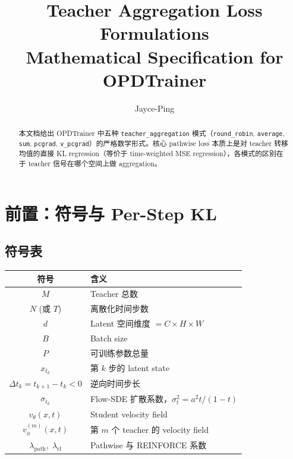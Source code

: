 \documentclass[11pt,a4paper]{article}
\title{\textbf{Teacher Aggregation Loss Formulations}\\[0.3em]
\large Mathematical Specification for OPDTrainer}
\author{Jayce-Ping}
\date{}
\newcommand{\vtheta}{v_\theta}
\newcommand{\vphi}{v_\phi}
\newcommand{\lpath}{\lambda_{\mathrm{path}}}
\newcommand{\lrf}{\lambda_{\mathrm{rf}}}
\theoremstyle{definition}
\begin{document}
\maketitle

\begin{abstract}
本文档给出 OPDTrainer 中五种 \texttt{teacher\_aggregation} 模式（\texttt{round\_robin}, \texttt{average}, \texttt{sum}, \texttt{pcgrad}, \texttt{v\_pcgrad}）的严格数学形式。核心 pathwise loss 本质上是对 teacher 转移均值的直接 KL regression（等价于 time-weighted MSE regression），各模式的区别在于 teacher 信号在哪个空间上做 aggregation。
\end{abstract}

\tableofcontents
\newpage

\section{前置：符号与 Per-Step KL}

\subsection{符号表}

\begin{center}
\begin{tabular}{cl}
\toprule
\textbf{符号} & \textbf{含义} \\
\midrule
$M$ & Teacher 总数 \\
$N$ (或 $T$) & 离散化时间步数 \\
$d$ & Latent 空间维度 $= C \times H \times W$ \\
$B$ & Batch size \\
$P$ & 可训练参数总量 \\
$x_{t_k}$ & 第 $k$ 步的 latent state \\
$\Delta t_k = t_{k+1} - t_k < 0$ & 逆向时间步长 \\
$\sigma_{t_k}$ & Flow-SDE 扩散系数，$\sigma_t^2 = a^2 t/(1-t)$ \\
$\vtheta(x,t)$ & Student velocity field \\
$\vphi^{(m)}(x,t)$ & 第 $m$ 个 teacher 的 velocity field \\
$\lpath,\; \lrf$ & Pathwise 与 REINFORCE 系数 \\
\bottomrule
\end{tabular}
\end{center}
\end{document}
